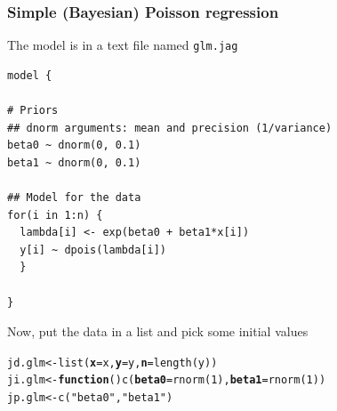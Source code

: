 \documentclass[color=usenames,dvipsnames]{beamer}\usepackage[]{graphicx}\usepackage[]{color}
\makeatletter
\newcommand{\hlnum}[1]{\textcolor[rgb]{0.69,0.494,0}{#1}}%
\newcommand{\hlstr}[1]{\textcolor[rgb]{0.749,0.012,0.012}{#1}}%
\newcommand{\hlstd}[1]{\textcolor[rgb]{0,0,0}{#1}}%
\newcommand{\hlkwa}[1]{\textcolor[rgb]{0,0,0}{\textbf{#1}}}%
\newcommand{\hlkwb}[1]{\textcolor[rgb]{0,0.341,0.682}{#1}}%
\newcommand{\hlkwc}[1]{\textcolor[rgb]{0,0,0}{\textbf{#1}}}%
\newcommand{\hlkwd}[1]{\textcolor[rgb]{0.004,0.004,0.506}{#1}}%
\newenvironment{kframe}{%
 \def\at@end@of@kframe{}%
 \ifinner\ifhmode%
  \def\at@end@of@kframe{\end{minipage}}%
  \begin{minipage}{\columnwidth}%
 \fi\fi%
 \def\FrameCommand##1{\hskip\@totalleftmargin \hskip-\fboxsep
 \colorbox{shadecolor}{##1}\hskip-\fboxsep
     \hskip-\linewidth \hskip-\@totalleftmargin \hskip\columnwidth}%
 \MakeFramed {\advance\hsize-\width
   \@totalleftmargin\z@ \linewidth\hsize
   \@setminipage}}%
 {\par\unskip\endMakeFramed%
 \at@end@of@kframe}
\newenvironment{knitrout}{}{} %
\makeatother
\begin{document}
\begin{frame}[fragile]
  \frametitle{Simple (Bayesian) Poisson regression}
  \small
  The model is in a text file named {\tt glm.jag} \\
\begin{knitrout}\scriptsize
{}\color{fgcolor}\begin{kframe}
\begin{verbatim}
model {

# Priors
## dnorm arguments: mean and precision (1/variance)
beta0 ~ dnorm(0, 0.1)  
beta1 ~ dnorm(0, 0.1)

## Model for the data
for(i in 1:n) {
  lambda[i] <- exp(beta0 + beta1*x[i])
  y[i] ~ dpois(lambda[i])
  }

}
\end{verbatim}
\end{kframe}
\end{knitrout}
\pause
\vfill
Now, put the data in a list and pick some initial values
\begin{knitrout}
\color{fgcolor}\begin{kframe}
\begin{alltt}
\hlstd{jd.glm} \hlkwb{<-} \hlkwd{list}\hlstd{(}\hlkwc{x}\hlstd{=x,} \hlkwc{y}\hlstd{=y,} \hlkwc{n}\hlstd{=}\hlkwd{length}\hlstd{(y))}
\hlstd{ji.glm} \hlkwb{<-} \hlkwa{function}\hlstd{()} \hlkwd{c}\hlstd{(}\hlkwc{beta0}\hlstd{=}\hlkwd{rnorm}\hlstd{(}\hlnum{1}\hlstd{),} \hlkwc{beta1}\hlstd{=}\hlkwd{rnorm}\hlstd{(}\hlnum{1}\hlstd{))}
\hlstd{jp.glm} \hlkwb{<-} \hlkwd{c}\hlstd{(}\hlstr{"beta0"}\hlstd{,} \hlstr{"beta1"}\hlstd{)}
\end{alltt}
\end{kframe}
\end{knitrout}
\end{frame}
\end{document}
